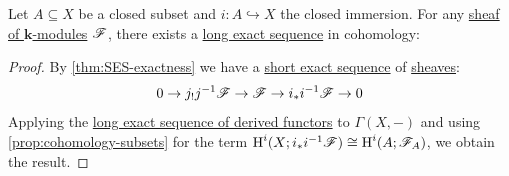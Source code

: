 \documentclass[../../main]{subfiles}
\begin{document}
\begin{theorem}[Exactness]\label{thm:exactness-axiom}
  Let \(A \subseteq X\) be a closed subset and \(i\colon A \hookrightarrow X\) the closed immersion.
  For any \hyperref[def:sheaf]{sheaf of \(\mathbf{k}\)-modules} \(\mathscr{F}\), there exists a \hyperref[def:exact-sequence]{long exact sequence} in cohomology:
  \begin{center}
  \end{center}
\end{theorem}
\begin{proof}
  By \autoref{thm:SES-exactness} we have a \hyperref[def:exact-sequence]{short exact sequence} of \hyperref[def:sheaf]{sheaves}:
  \begin{equation*}
    0 \to j_{!}j^{-1}\mathscr{F} \to \mathscr{F} \to i_{\ast}i^{-1}\mathscr{F} \to 0
  \end{equation*}
  Applying the \hyperref[thm:LES-derived-functor]{long exact sequence of derived functors} to \(\Gamma(X, -)\) and using \autoref{prop:cohomology-subsets} for the term \(\operatorname{H}^{i}(X; i_{\ast}i^{-1}\mathscr{F}) \cong \operatorname{H}^{i}(A; \mathscr{F}_{A})\), we obtain the result.
\end{proof}
\end{document}
